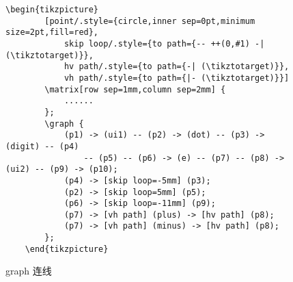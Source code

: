 \begin{figure}[H]
\begin{minipage}{0.8\linewidth}
\begin{lstlisting}[style = latex-side]
    \begin{tikzpicture}
        [point/.style={circle,inner sep=0pt,minimum size=2pt,fill=red},
            skip loop/.style={to path={-- ++(0,#1) -| (\tikztotarget)}},
            hv path/.style={to path={-| (\tikztotarget)}},
            vh path/.style={to path={|- (\tikztotarget)}}]
        \matrix[row sep=1mm,column sep=2mm] {
            ......
        };
        \graph {
            (p1) -> (ui1) -- (p2) -> (dot) -- (p3) -> (digit) -- (p4)
                -- (p5) -- (p6) -> (e) -- (p7) -- (p8) -> (ui2) -- (p9) -> (p10);
            (p4) -> [skip loop=-5mm] (p3);
            (p2) -> [skip loop=5mm] (p5);
            (p6) -> [skip loop=-11mm] (p9);
            (p7) -> [vh path] (plus) -> [hv path] (p8);
            (p7) -> [vh path] (minus) -> [hv path] (p8);
        };
    \end{tikzpicture}
        \end{lstlisting}
    \end{minipage}
    \caption{graph 连线}
\end{figure}


